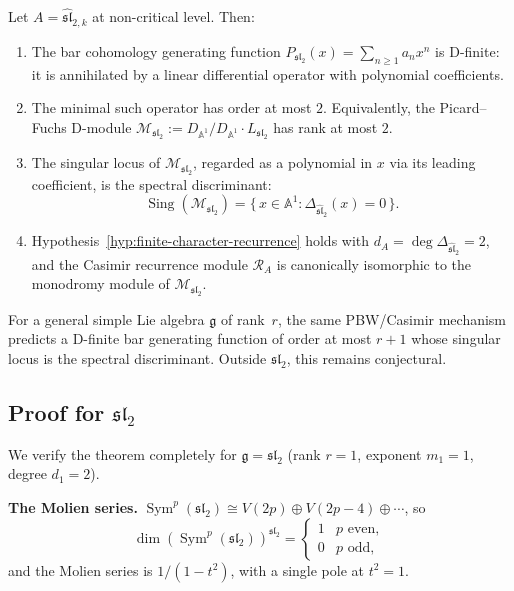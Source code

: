 \begin{theorem}
\label{thm:pbw-recurrence}
Let \(A=\widehat{\mathfrak{sl}}_{2,k}\) at non-critical level.
Then:
\begin{enumerate}[label=\textup{(\alph*)}]
\item
The bar cohomology generating function
\(P_{\mathfrak{sl}_2}(x)=\sum_{n\ge 1}a_n x^n\)
is D-finite: it is annihilated by a linear differential
operator with polynomial coefficients.
\item
The minimal such operator has order at most \(2\).
Equivalently, the Picard--Fuchs D-module
\(\mathcal M_{\mathfrak{sl}_2}:=D_{\mathbb A^1}/D_{\mathbb A^1}
\cdot L_{\mathfrak{sl}_2}\) has rank at most \(2\).
\item
The singular locus of \(\mathcal M_{\mathfrak{sl}_2}\),
regarded as a polynomial in \(x\) via its leading coefficient,
is the spectral discriminant:
\[
\operatorname{Sing}(\mathcal M_{\mathfrak{sl}_2})
=\{\,x\in\mathbb A^1:\Delta_{\widehat{\mathfrak{sl}}_2}(x)=0\,\}.
\]
\item
Hypothesis~\ref{hyp:finite-character-recurrence} holds with
\(d_A=\deg\Delta_{\widehat{\mathfrak{sl}}_2}=2\), and the
Casimir recurrence module \(\mathcal R_A\) is canonically
isomorphic to the monodromy module of
\(\mathcal M_{\mathfrak{sl}_2}\).
\end{enumerate}
\end{theorem}

\begin{remark}
For a general simple Lie algebra \(\mathfrak g\) of rank~\(r\), the
same PBW/Casimir mechanism predicts a D-finite bar generating function
of order at most \(r+1\) whose singular locus is the spectral
discriminant. Outside \(\mathfrak{sl}_2\), this remains conjectural.
\end{remark}

\subsection{Proof for \texorpdfstring{$\mathfrak{sl}_2$}{sl(2)}}
\label{subsec:pbw-recurrence-sl2}

We verify the theorem completely for \(\mathfrak g=\mathfrak{sl}_2\)
(rank \(r=1\), exponent \(m_1=1\), degree \(d_1=2\)).

\medskip\noindent
\textbf{The Molien series.}
\(\operatorname{Sym}^p(\mathfrak{sl}_2)\cong
V(2p)\oplus V(2p-4)\oplus\cdots\),
so
\[
\dim(\operatorname{Sym}^p(\mathfrak{sl}_2))^{\mathfrak{sl}_2}
=\begin{cases}1&p\text{ even},\\0&p\text{ odd},\end{cases}
\]
and the Molien series is \(1/(1-t^2)\), with a single pole at
\(t^2=1\).

